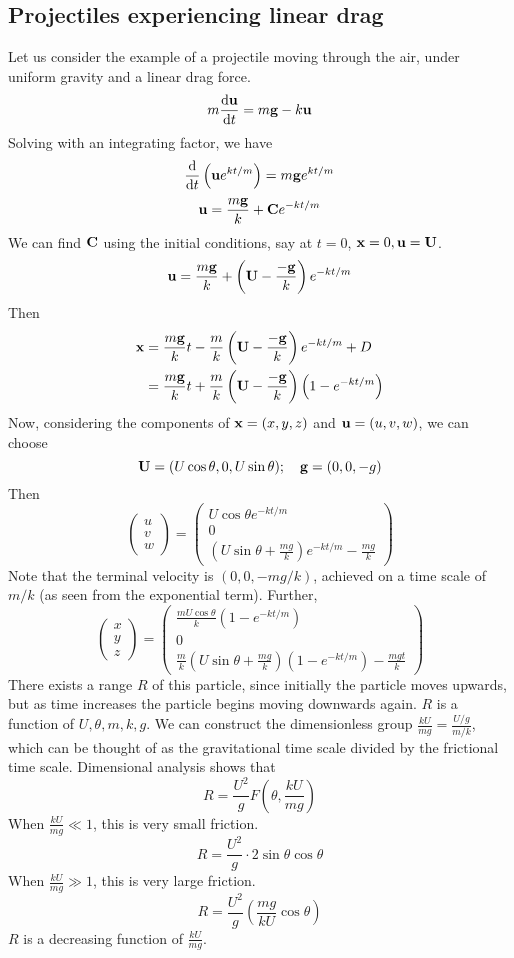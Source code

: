 \subsection{Projectiles experiencing linear drag}
Let us consider the example of a projectile moving through the air, under uniform gravity and a linear drag force.
\[
	m \frac{\dd \vb u}{\dd{t}} = m\vb g - k\vb u
\]
Solving with an integrating factor, we have
\[
	\frac{\dd}{\dd{t}}\left( \vb u e^{kt/m} \right) = m\vb g e^{kt/m}
\]
\[
	\vb u = \frac{m\vb g}{k} + \vb C e^{-kt/m}
\]
We can find \(\vb C\) using the initial conditions, say at \(t=0\), \(\vb x = 0, \vb u = \vb U\).
\[
	\vb u = \frac{m\vb g}{k} + \left( \vb U - \frac{-\vb g}{k} \right) e^{-kt/m}
\]
Then
\begin{align*}
	\vb x & = \frac{m\vb g}{k}t - \frac{m}{k}\left( \vb U - \frac{-\vb g}{k} \right) e^{-kt/m} + D               \\
	      & =\frac{m\vb g}{k}t + \frac{m}{k}\left( \vb U - \frac{-\vb g}{k} \right) \left( 1 - e^{-kt/m} \right)
\end{align*}
Now, considering the components of \(\vb x = (x, y, z)\) and \(\vb u = (u, v, w)\), we can choose
\[
	\vb U = (U \cos \theta, 0, U\sin\theta);\quad \vb g = (0, 0, -g)
\]
Then
\[
	\begin{pmatrix}
		u \\ v \\ w
	\end{pmatrix} = \begin{pmatrix}
		U\cos\theta e^{-kt/m} \\
		0                     \\
		\left(U \sin\theta + \frac{mg}{k}\right)e^{-kt/m} - \frac{mg}{k}
	\end{pmatrix}
\]
Note that the terminal velocity is \((0, 0, -mg/k)\), achieved on a time scale of \(m/k\) (as seen from the exponential term).
Further,
\[
	\begin{pmatrix}
		x \\ y \\ z
	\end{pmatrix} = \begin{pmatrix}
		\frac{mU\cos\theta}{k}\left( 1 - e^{-kt/m} \right) \\
		0                                                  \\
		\frac{m}{k}\left( U \sin\theta + \frac{mg}{k} \right)\left( 1 - e^{-kt/m} \right) - \frac{mgt}{k}
	\end{pmatrix}
\]
There exists a range \(R\) of this particle, since initially the particle moves upwards, but as time increases the particle begins moving downwards again.
\(R\) is a function of \(U, \theta, m, k, g\).
We can construct the dimensionless group \(\frac{kU}{mg} = \frac{U/g}{m/k}\), which can be thought of as the gravitational time scale divided by the frictional time scale.
Dimensional analysis shows that
\[
	R = \frac{U^2}{g}F\left(\theta, \frac{kU}{mg}\right)
\]
When \(\frac{kU}{mg} \ll 1\), this is very small friction.
\[
	R = \frac{U^2}{g}\cdot 2\sin\theta\cos\theta
\]
When \(\frac{kU}{mg} \gg 1\), this is very large friction.
\[
	R = \frac{U^2}{g} \left( \frac{mg}{kU}\cos\theta \right)
\]
\(R\) is a decreasing function of \(\frac{kU}{mg}\).
